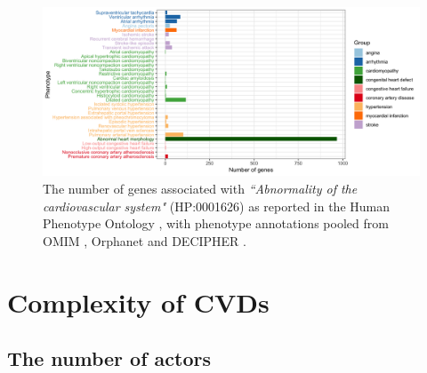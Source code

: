\documentclass[letter]{bioinfo}
\begin{document}
		\begin{figure}[!tpb]
		\includegraphics[width=1.\linewidth]{hpo-gene-count}
		\caption{The number of genes associated with \emph{``Abnormality of the cardiovascular system"} (HP:0001626) as reported in the Human Phenotype Ontology \citep{Kohler:2014:Human},
			 with phenotype annotations pooled from OMIM \citep{McKusick:2018:OMIM} , Orphanet \citep{INSERM:1997:Orphanet}  and DECIPHER \citep{Firth:2009:DECIPHER}.}
		\label{fig:hpo_gene_count}	
	\end{figure}
	
	
	
	
	\section*{Complexity of CVDs}  %
	\subsection*{The number of actors}
	
\end{document}
